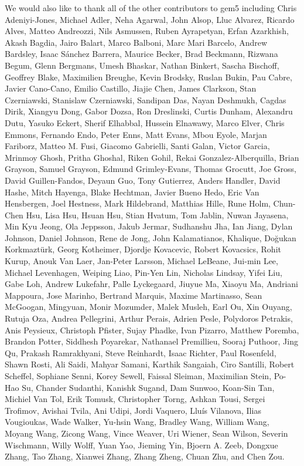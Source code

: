 \documentclass[sigconf,nonacm,screen=true]{acmart}
\begin{document}
We would also like to thank all of the other contributors to gem5 including
Chris Adeniyi-Jones, Michael Adler, Neha Agarwal, John Alsop, Lluc Alvarez, Ricardo Alves, Matteo Andreozzi, Nils Asmussen, Ruben Ayrapetyan, Erfan Azarkhish, Akash Bagdia, Jairo Balart, Marco Balboni, Marc Mari Barcelo, Andrew Bardsley, Isaac S\'anchez Barrera, Maurice Becker, Brad Beckmann, Rizwana Begum, Glenn Bergmans, Umesh Bhaskar, Nathan Binkert, Sascha Bischoff, Geoffrey Blake, Maximilien Breughe, Kevin Brodsky, Ruslan Bukin, Pau Cabre, Javier Cano-Cano, Emilio Castillo, Jiajie Chen, James Clarkson, Stan Czerniawski, Stanislaw Czerniawski, Sandipan Das, Nayan Deshmukh, Cagdas Dirik, Xiangyu Dong, Gabor Dozsa, Ron Dreslinski, Curtis Dunham, Alexandru Dutu, Yasuko Eckert, Sherif Elhabbal, Hussein Elnawawy, Marco Elver, Chris Emmons, Fernando Endo, Peter Enns, Matt Evans, Mbou Eyole, Marjan Fariborz, Matteo M. Fusi, Giacomo Gabrielli, Santi Galan, Victor Garcia, Mrinmoy Ghosh, Pritha Ghoshal, Riken Gohil, Rekai Gonzalez-Alberquilla, Brian Grayson, Samuel Grayson, Edmund Grimley-Evans, Thomas Grocutt, Joe Gross, David Guillen-Fandos, Deyaun Guo, Tony Gutierrez, Anders Handler, David Hashe, Mitch Hayenga, Blake Hechtman, Javier Bueno Hedo, Eric Van Hensbergen, Joel Hestness, Mark Hildebrand, Matthias Hille, Rune Holm, Chun-Chen Hsu, Lisa Hsu, Hsuan Hsu, Stian Hvatum, Tom Jablin, Nuwan Jayasena, Min Kyu Jeong, Ola Jeppsson, Jakub Jermar, Sudhanshu Jha, Ian Jiang, Dylan Johnson, Daniel Johnson, Rene de Jong, John Kalamatianos, Khalique, Do\u{g}ukan Korkmazt\"urk, Georg Kotheimer, Djordje Kovacevic, Robert Kovacsics, Rohit Kurup, Anouk Van Laer, Jan-Peter Larsson, Michael LeBeane, Jui-min Lee, Michael Levenhagen, Weiping Liao, Pin-Yen Lin, Nicholas Lindsay, Yifei Liu, Gabe Loh, Andrew Lukefahr, Palle Lyckegaard, Jiuyue Ma, Xiaoyu Ma, Andriani Mappoura, Jose Marinho, Bertrand Marquis, Maxime Martinasso, Sean McGoogan, Mingyuan, Monir Mozumder, Malek Musleh, Earl Ou, Xin Ouyang, Rutuja Oza, Andrea Pellegrini, Arthur Perais, Adrien Pesle, Polydoros Petrakis, Anis Peysieux, Christoph Pfister, Sujay Phadke, Ivan Pizarro, Matthew Poremba, Brandon Potter, Siddhesh Poyarekar, Nathanael Premillieu, Sooraj Puthoor, Jing Qu, Prakash Ramrakhyani, Steve Reinhardt, Isaac Richter, Paul Rosenfeld, Shawn Rosti, Ali Saidi, Mahyar Samani, Karthik Sangaiah, Ciro Santilli, Robert Scheffel, Sophiane Senni, Korey Sewell, Faissal Sleiman, Maximilian Stein, Po-Hao Su, Chander Sudanthi, Kanishk Sugand, Dam Sunwoo, Koan-Sin Tan, Michiel Van Tol, Erik Tomusk, Christopher Torng, Ashkan Tousi, Sergei Trofimov, Avishai Tvila, Ani Udipi, Jordi Vaquero, Llu\'is Vilanova, Ilias Vougioukas, Wade Walker, Yu-hsin Wang, Bradley Wang, William Wang, Moyang Wang, Zicong Wang, Vince Weaver, Uri Wiener, Sean Wilson, Severin Wischmann, Willy Wolff, Yuan Yao, Jieming Yin, Bjoern A. Zeeb, Dongxue Zhang, Tao Zhang, Xianwei Zhang, Zhang Zheng, Chuan Zhu, and Chen Zou.



\end{document}
